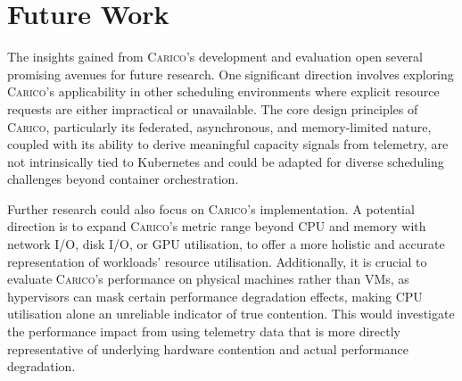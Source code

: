 
\section{Future Work}
The insights gained from \textsc{Carico}'s development and evaluation open
several promising avenues for future research. One significant direction
involves exploring \textsc{Carico}'s applicability in other scheduling
environments where explicit resource requests are either impractical or
unavailable. The core design principles of \textsc{Carico}, particularly its
federated, asynchronous, and memory-limited nature, coupled with its ability to
derive meaningful capacity signals from telemetry, are not intrinsically tied
to Kubernetes and could be adapted for diverse scheduling challenges beyond
container orchestration.

Further research could also focus on \textsc{Carico}'s implementation. A
potential direction is to expand \textsc{Carico}'s metric range beyond CPU and
memory with network I/O, disk I/O, or GPU utilisation, to offer a more holistic
and accurate representation of workloads' resource utilisation. Additionally, it
is crucial to evaluate \textsc{Carico}'s performance on physical machines rather
than VMs, as hypervisors can mask certain performance degradation effects, making
CPU utilisation alone an unreliable indicator of true contention. This would
investigate the performance impact from using telemetry data that is more
directly representative of underlying hardware contention and actual performance
degradation.
